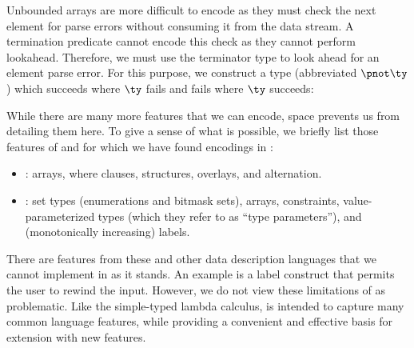 Unbounded arrays are more difficult to encode as they must check the
next element for parse errors without consuming it from the data
stream. A termination predicate cannot encode this check as they
cannot perform lookahead. Therefore, we must use the terminator type
to look ahead for an element parse error. For this purpose, we
construct a type (abbreviated $\pnot \ty$) which succeeds where $\ty$
fails and fails where $\ty$ succeeds: 

While there are many more features that we can encode, space prevents us from
detailing them here. To give a sense of what is possible, we
briefly list those features of \datascript{} and \packettypes{} for
which we have found encodings in \ddc{}:
\begin{itemize}
\item \packettypes{}: arrays, where clauses, structures, overlays,
  and alternation.
\item \datascript{}: set types (enumerations and bitmask sets),
  arrays, constraints, value-parameterized types (which they refer to
  as ``type parameters''), and (monotonically increasing) labels.
\end{itemize}

There are features from these and other data description languages
that we cannot implement in \ddc{} as it stands.  An example is a label construct that permits the user to rewind the input. However, we do not view these limitations of
\ddc{} as problematic. Like the simple-typed lambda calculus, \ddc{}
is intended to capture many common language features, while providing
a convenient and effective basis for extension with new features.


